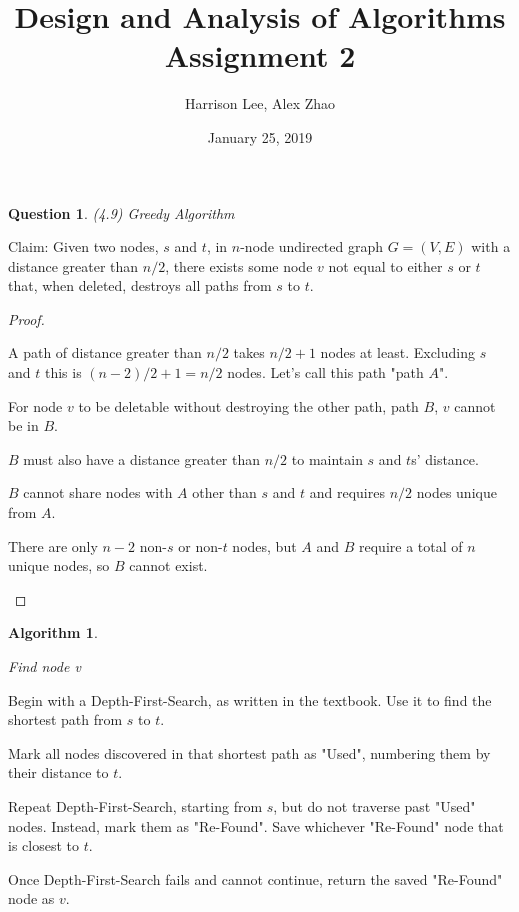 \documentclass[11pt, oneside]{article}   	%
\title {Design and Analysis of Algorithms Assignment 2}
\author{Harrison Lee, Alex Zhao}
\date{January 25, 2019}
\newtheorem{Question}{Question}
\newtheorem{Algorithm}{Algorithm}
\begin{document}
\maketitle

\begin{Question} (4.9) Greedy Algorithm
\end{Question}

Claim: Given two nodes, $s$ and $t$, in $n$-node undirected graph $G = (V, E)$ with a distance greater than $n/2$, there exists some node $v$ not equal to either $s$ or $t$ that, when deleted, destroys all paths from $s$ to $t$.

\begin{proof}
\begin{description}

A path of distance greater than $n/2$ takes $n/2 + 1$ nodes at least. Excluding $s$ and $t$ this is $(n-2)/2 + 1= n/2$ nodes. Let's call this path "path $A$".

For node $v$ to be deletable without destroying the other path, path $B$, $v$ cannot be in $B$.

$B$ must also have a distance greater than $n/2$ to maintain $s$ and $t$s' distance.

$B$ cannot share nodes with $A$ other than $s$ and $t$ and requires $n/2$ nodes unique from $A$.

There are only $n-2$ non-$s$ or non-$t$ nodes, but $A$ and $B$ require a total of $n$ unique nodes, so $B$ cannot exist.

\end{description}
\end{proof}

\begin{Algorithm}
\begin{description}
Find node v
\end{description}
\end{Algorithm}

Begin with a Depth-First-Search, as written in the textbook. Use it to find the shortest path from $s$ to $t$.

Mark all nodes discovered in that shortest path as "Used", numbering them by their distance to $t$.

Repeat Depth-First-Search, starting from $s$, but do not traverse past "Used" nodes. Instead, mark them as "Re-Found". Save whichever "Re-Found" node that is closest to $t$.

Once Depth-First-Search fails and cannot continue, return the saved "Re-Found" node as $v$.
\end{document}
